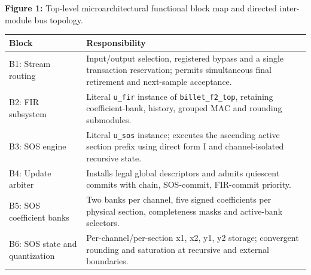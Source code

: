 \documentclass[11pt,a4paper]{article}
\begin{document}
\begin{center}
\begin{minipage}{\textwidth}
\par\vspace{3pt}

{\small\textbf{Figure 1:} Top-level microarchitectural functional block map and directed inter-module bus topology.}\end{minipage}\end{center}

{\small\renewcommand{\arraystretch}{1.18}\begin{longtable}{@{}L{0.24\textwidth}|L{0.7\textwidth}@{}}\toprule

\textbf{Block} & \textbf{Responsibility}\\\midrule\endhead

B1: Stream routing & Input/\allowbreak{}output selection,\allowbreak{} registered bypass and a single transaction reservation; permits simultaneous final retirement and next-sample acceptance.\\[2pt]\hline

B2: FIR subsystem & Literal \texttt{u\_\allowbreak{}fir} instance of \texttt{billet\_\allowbreak{}f2\_\allowbreak{}top},\allowbreak{} retaining coefficient-bank,\allowbreak{} history,\allowbreak{} grouped MAC and rounding submodules.\\[2pt]\hline

B3: SOS engine & Literal \texttt{u\_\allowbreak{}sos} instance; executes the ascending active section prefix using direct form I and channel-isolated recursive state.\\[2pt]\hline

B4: Update arbiter & Installs legal global descriptors and admits quiescent commits with chain,\allowbreak{} SOS-commit,\allowbreak{} FIR-commit priority.\\[2pt]\hline

B5: SOS coefficient banks & Two banks per channel,\allowbreak{} five signed coefficients per physical section,\allowbreak{} completeness masks and active-bank selectors.\\[2pt]\hline

B6: SOS state and quantization & Per-channel/\allowbreak{}per-section x1,\allowbreak{} x2,\allowbreak{} y1,\allowbreak{} y2 storage; convergent rounding and saturation at recursive and external boundaries.\\[2pt]\hline

\bottomrule\end{longtable}}
\end{document}
